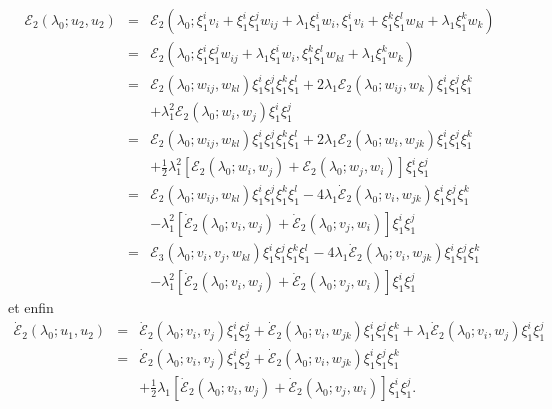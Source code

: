 \documentclass{article}
\newcommand{\nosymbol}{}
\begin{document}
\begin{eqnarray*}
  \mathcal{E}_2 (\lambda_0 ; u_2, u_2) & = & \mathcal{E}_2 (\lambda_0 ;
  \xi_1^i v_i + \xi_1^i \xi_1^j w_{i  j} + \lambda_1 \xi_1^i w_i,
  \xi_1^i v_i + \xi_1^k \xi_1^l w_{k  l} + \lambda_1 \xi_1^k w_k)\\
  & = & \mathcal{E}_2 (\lambda_0 ; \xi_1^i \xi_1^j w_{i  j} +
  \lambda_1 \xi_1^i w_i, \xi_1^k \xi_1^l w_{k  l} + \lambda_1 \xi_1^k
  w_k)\\
  & = & \mathcal{E}_2 (\lambda_0 ; w_{i  j}, w_{k  l})
  \xi_1^i \xi_1^j \xi_1^k \xi_1^l + 2 \lambda_1 \mathcal{E}_2 (\lambda_0 ;
  w_{i  j}, w_k) \xi_1^i \xi_1^j \xi_1^k\\
  &  & \nosymbol + \lambda_1^2 \mathcal{E}_2 (\lambda_0 ; w_i, w_j) \xi_1^i
  \xi_1^j\\
  & = & \mathcal{E}_2 (\lambda_0 ; w_{i  j}, w_{k  l})
  \xi_1^i \xi_1^j \xi_1^k \xi_1^l + 2 \lambda_1 \mathcal{E}_2 (\lambda_0 ;
  w_i, w_{j  k}) \xi_1^i \xi_1^j \xi_1^k\\
  &  & \nosymbol + \tfrac{1}{2} \lambda_1^2  [\mathcal{E}_2 (\lambda_0 ; w_i,
  w_j) +\mathcal{E}_2 (\lambda_0 ; w_j, w_i)] \xi_1^i \xi_1^j\\
  & = & \mathcal{E}_2 (\lambda_0 ; w_{i  j}, w_{k  l})
  \xi_1^i \xi_1^j \xi_1^k \xi_1^l - 4 \lambda_1  \dot{\mathcal{E}}_2
  (\lambda_0 ; v_i, w_{j  k}) \xi_1^i \xi_1^j \xi_1^k\\
  &  & \nosymbol - \lambda_1^2  [\dot{\mathcal{E}}_2 (\lambda_0 ; v_i, w_j) +
  \dot{\mathcal{E}}_2 (\lambda_0 ; v_j, w_i)] \xi_1^i \xi_1^j\\
  & = & \mathcal{E}_3 (\lambda_0 ; v_i, v_j, w_{k  l}) \xi_1^i
  \xi_1^j \xi_1^k \xi_1^l - 4 \lambda_1  \dot{\mathcal{E}}_2 (\lambda_0 ; v_i,
  w_{j  k}) \xi_1^i \xi_1^j \xi_1^k\\
  &  & \nosymbol - \lambda_1^2  [\dot{\mathcal{E}}_2 (\lambda_0 ; v_i, w_j) +
  \dot{\mathcal{E}}_2 (\lambda_0 ; v_j, w_i)] \xi_1^i \xi_1^j
\end{eqnarray*}
et enfin
\begin{eqnarray*}
  \dot{\mathcal{E}}_2 (\lambda_0 ; u_1, u_2) & = & \dot{\mathcal{E}}_2
  (\lambda_0 ; v_i, v_j) \xi_1^i \xi_2^j + \dot{\mathcal{E}}_2 (\lambda_0 ;
  v_i, w_{j  k}) \xi_1^i \xi_1^j \xi_1^k + \lambda_1
  \dot{\mathcal{E}}_2 (\lambda_0 ; v_i, w_j) \xi_1^i \xi_1^j\\
  & = & \dot{\mathcal{E}}_2 (\lambda_0 ; v_i, v_j) \xi_1^i \xi_2^j +
  \dot{\mathcal{E}}_2 (\lambda_0 ; v_i, w_{j  k}) \xi_1^i \xi_1^j
  \xi_1^k\\
  &  & \nosymbol + \tfrac{1}{2} \lambda_1  [\dot{\mathcal{E}}_2 (\lambda_0 ;
  v_i, w_j) + \dot{\mathcal{E}}_2 (\lambda_0 ; v_j, w_i)] \xi_1^i \xi_1^j .
\end{eqnarray*}
\end{document}
